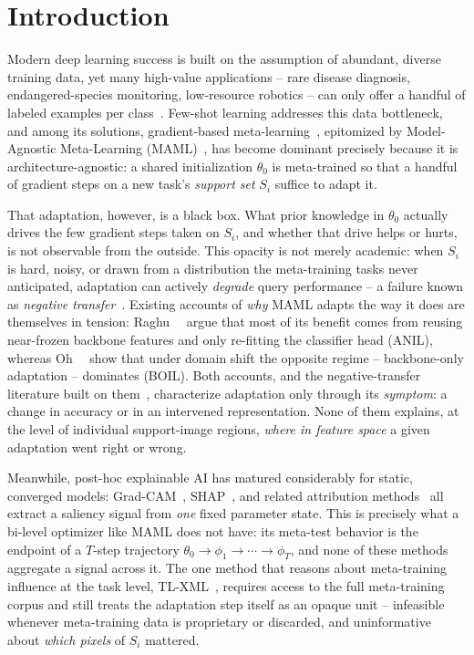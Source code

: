 \section{Introduction}
\label{sec:intro}

Modern deep learning success is built on the assumption of abundant, diverse training data, yet many high-value applications -- rare disease diagnosis, endangered-species monitoring, low-resource robotics -- can only offer a handful of labeled examples per class~\cite{fawakherji2026learning,wang2020generalizing}. Few-shot learning addresses this data bottleneck, and among its solutions, gradient-based meta-learning~\cite{schmidhuber1987evolutionary,bengio2013optimization}, epitomized by Model-Agnostic Meta-Learning (MAML)~\cite{finn2017model}, has become dominant precisely because it is architecture-agnostic: a shared initialization $\theta_0$ is meta-trained so that a handful of gradient steps on a new task's \emph{support set} $S_i$ suffice to adapt it.

That adaptation, however, is a black box. What prior knowledge in $\theta_0$ actually drives the few gradient steps taken on $S_i$, and whether that drive helps or hurts, is not observable from the outside. This opacity is not merely academic: when $S_i$ is hard, noisy, or drawn from a distribution the meta-training tasks never anticipated, adaptation can actively \emph{degrade} query performance -- a failure known as \emph{negative transfer}~\cite{yue2020interventional,si2025meta}. Existing accounts of \emph{why} MAML adapts the way it does are themselves in tension: Raghu~\etal~\cite{raghu2019rapid} argue that most of its benefit comes from reusing near-frozen backbone features and only re-fitting the classifier head (ANIL), whereas Oh~\etal~\cite{oh2020boil} show that under domain shift the opposite regime -- backbone-only adaptation -- dominates (BOIL). Both accounts, and the negative-transfer literature built on them~\cite{yao2019hierarchically,yao2020automated,chen2021hetmaml,parast2026hsfm}, characterize adaptation only through its \emph{symptom}: a change in accuracy or in an intervened representation. None of them explains, at the level of individual support-image regions, \emph{where in feature space} a given adaptation went right or wrong.

Meanwhile, post-hoc explainable AI has matured considerably for static, converged models: Grad-CAM~\cite{selvaraju2020grad}, SHAP~\cite{lundberg2017unified}, and related attribution methods~\cite{simonyan2014visualising,sundararajan2017axiomatic,ribeiro2016lime} all extract a saliency signal from \emph{one} fixed parameter state. This is precisely what a bi-level optimizer like MAML does not have: its meta-test behavior is the endpoint of a $T$-step trajectory $\theta_0 \!\to\! \phi_1 \!\to\! \cdots \!\to\! \phi_T$, and none of these methods aggregate a signal across it. The one method that reasons about meta-training influence at the task level, TL-XML~\cite{mitsuka2025tlxml}, requires access to the full meta-training corpus and still treats the adaptation step itself as an opaque unit -- infeasible whenever meta-training data is proprietary or discarded, and uninformative about \emph{which pixels} of $S_i$ mattered.

